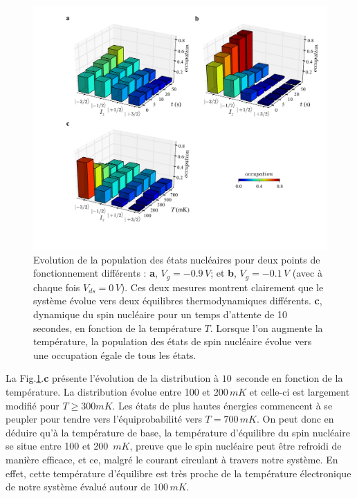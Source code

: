 \begin{figure}[h!]
\includegraphics[scale=0.45]{Resultats/SpinTemp/SpinTemp.pdf} 
\caption{Evolution de la population des états nucléaires pour deux points de fonctionnement différents : \textbf{a}, $V_g = -0.9\,V$; et \textbf{b}, $V_g = -0.1\,V$ (avec à chaque fois $V_{ds} = 0\,V$). Ces deux mesures montrent clairement que le système évolue vers deux équilibres thermodynamiques différents. \textbf{c}, dynamique du spin nucléaire pour un temps d'attente de 10 secondes, en fonction de la température $T$. Lorsque l'on augmente la température, la population des états de spin nucléaire évolue vers une occupation égale de tous les états.}
\label{dynamique_spin}
\end{figure}


La Fig.\ref{dynamique_spin}.\textbf{c} présente l'évolution de la distribution à $10\,$ seconde en fonction de la température. La distribution évolue entre 100 et 200$\,mK$ et celle-ci est largement modifié pour $T\geq 300mK$. Les états de plus hautes énergies commencent à se peupler pour tendre vers l'équiprobabilité vers $T=700\,mK$. On peut donc en déduire qu'à la température de base, la température d'équilibre du spin nucléaire se situe entre 100 et 200 $\,mK$, preuve que le spin nucléaire peut être refroidi de manière efficace, et ce, malgré le courant circulant à travers notre système. En effet, cette température d'équilibre est très proche de la température électronique de notre système évalué autour de $100\,mK$.
